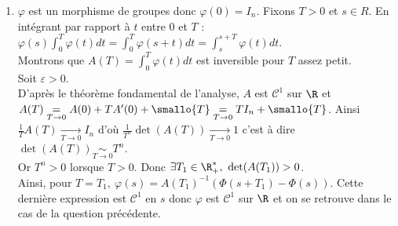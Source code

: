 \documentclass{book}
\begin{document}
\begin{enumerate}[leftmargin=*]
		$\forall (s,t)\in \R^2,\ \varphi(s)\varphi(t)=Ae^{sB}Ae^{tB}=e^{sB}A^2e^{tB}=e^{sB}Ae^{tB}=Ae^{sB}e^{tB}=Ae^{(s+t)B}=\varphi(s+t)$.
		\item $\varphi$ est un morphisme de groupes donc $\varphi(0)=I_n$. Fixons $T>0$ et $s\in R$. En intégrant par rapport à $t$ entre $0$ et $T$ :\\
		$\varphi(s)\displaystyle\int_0^T\varphi(t)dt=\int_0^T\varphi(s+t)dt=\int_s^{s+T}\varphi(t)dt$.\\
		Montrons que $A(T)=\displaystyle\int_0^T\varphi(t)dt$ est inversible pour $T$ assez petit.\\
		Soit $\varepsilon>0$.\\
		D'après le théorème fondamental de l'analyse, $A$ est $\mathcal C^1$ sur $\R$ et $A(T)\underset{T\to 0}{=}A(0)+TA'(0)+\smallo{T}\underset{T\to 0}{=}TI_n+\smallo{T}$. Ainsi $\displaystyle\frac{1}{T}A(T)\underset{T\to 0}{\longrightarrow}I_n$ d'où $\displaystyle\frac{1}{T^n}\det(A(T))\underset{T\to 0}{\longrightarrow}1$ c'est à dire $\det(A(T))\underset{T\to 0}{\sim}T^n$.\\
		Or $T^n>0$ lorsque $T>0$. Donc $\exists T_1\in \R^*_+,\ \det(A(T_1))>0$.\\
		Ainsi, pour $T=T_1,\ \varphi(s)=A(T_1)^{-1}(\Phi(s+T_1)-\Phi(s))$. Cette dernière expression est $\mathcal C^1$ en $s$ donc $\varphi$ est $\mathcal C^1$ sur $\R$ et on se retrouve dans le cas de la question précédente.
	\end{enumerate}
	
\end{document}
